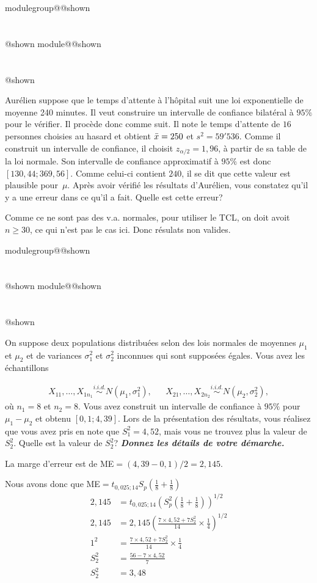 \documentclass{Evaluation}
\makeatletter
\newcommand{\currentmodulekey}{}
\newcommand{\currentmoduletitle}{}
\newcommand{\currentgroupkey}{}
\newcommand{\currentgrouptitle}{}
\newcommand{\showmoduleifneeded}{%
  \ifx\currentgroupkey\empty\else
    \expandafter\ifx\csname modulegroup@\currentgroupkey @shown\endcsname\relax
      \section*{\currentgrouptitle}%
      \expandafter\gdef\csname modulegroup@\currentgroupkey @shown\endcsname{1}%
    \fi
  \fi
  \expandafter\ifx\csname module@\currentmodulekey @shown\endcsname\relax
    \section*{\currentmoduletitle}%
    \expandafter\gdef\csname module@\currentmodulekey @shown\endcsname{1}%
  \fi
}
\newenvironment{H23}{\showmoduleifneeded}{}
\makeatother
\begin{document}
\begin{questions}
\begin{H23}
\question {} %
Aurélien suppose que le temps d'attente à l'hôpital suit une loi exponentielle de moyenne 240 minutes.
Il veut construire un intervalle de confiance bilatéral à $95\%$ pour le vérifier.
Il procède donc comme suit.
Il note le temps d'attente de $16$ personnes choisies au hasard et obtient $\Bar{x}=250$ et $s^2=59'536$.
Comme il construit un intervalle de confiance, il choisit $z_{\alpha/2}=1,96$, à partir de sa table de la loi normale.
Son intervalle de confiance approximatif à $95\%$ est donc $[130,44;369,56]$.
Comme celui-ci contient $240$, il se dit que cette valeur est plausible pour~$\mu$.
Après avoir vérifié les résultats d'Aurélien, vous constatez qu'il y a une erreur dans ce qu'il a fait.
Quelle est cette erreur?
\begin{solution}
    Comme ce ne sont pas des v.a. normales, pour utiliser le TCL, on doit avoit $n\geq30$, ce qui n'est pas le cas ici. Donc résulats non valides.
\end{solution}

\end{H23}

\begin{H23}
\question {} %
On suppose deux populations distribuées selon des lois normales de moyennes $\mu_1$ et $\mu_2$ et de variances $\sigma^2_1$ et $\sigma^2_2$ inconnues qui sont supposées égales. Vous avez les échantillons

\begin{align*}
X_{11}, \ldots, X_{1n_1} \overset{i.i.d.}{\sim} N(\mu_1, \sigma^2_1), & & X_{21}, \ldots, X_{2n_2} \overset{i.i.d.}{\sim} N(\mu_2, \sigma^2_2),
\end{align*}
où $n_1=8$ et $n_2=8$. Vous avez construit un intervalle de confiance à $95\%$ pour $\mu_1-\mu_2$ et obtenu $[0,1; 4,39]$. Lors de la présentation des résultats, vous réalisez que vous avez pris en note que $S^2_1=4,52$, mais vous ne trouvez plus la valeur de $S^2_2$. Quelle est la valeur de $S^2_2$? \textit{\textbf{Donnez les détails de votre démarche.}}

\begin{solution}
    La marge d'erreur est de ME$=(4,39-0,1)/2=2,145$.

    Nous avons donc que ME$=t_{0,025;14}S_p(\frac{1}{8}+\frac{1}{8})$
    \begin{align*}
        2,145&=t_{0,025;14}\left(S_p^2\left(\frac{1}{8}+\frac{1}{8}\right)\right)^{1/2}\\
        2,145&=2,145 \left(\frac{7\times4,52+7 S_2^2}{14} \times \frac{1}{4}\right)^{1/2}\\
        1^2 &= \frac{7\times4,52+7 S_2^2}{14} \times \frac{1}{4}\\
        S_2^2&=\frac{56-7\times 4,52}{7}\\
        S_2^2&=3,48
    \end{align*}
\end{solution}
\end{H23}


\end{questions}
\end{document}
